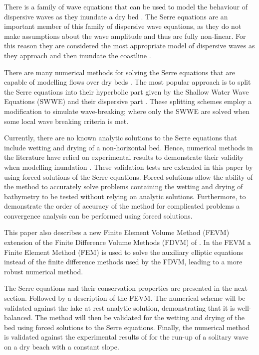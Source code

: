 \documentclass[times]{elsarticle}
\begin{document}
There is a family of wave equations that can be used to model the behaviour of dispersive waves as they inundate a dry bed \cite{Bonneton-Lannes-2009-16601}. The Serre equations \cite{Serre-F-1953-857} are an important member of this family of dispersive wave equations, as they do not make assumptions about the wave amplitude and thus are fully non-linear. For this reason they are considered the most appropriate model of dispersive waves as they approach and then inundate the coastline \cite{Bonneton-Lannes-2009-16601}.

There are many numerical methods for solving the Serre equations that are capable of modelling flows over dry beds \cite{Tissier-2011,Li-2014-169,Filippini-etal-2016-381,DoCarmo-2019-125}. The most popular approach is to split the Serre equations into their hyperbolic part given by the Shallow Water Wave Equations (SWWE) and their dispersive part \cite{Tissier-2011,Filippini-etal-2016-381,DoCarmo-2019-125}. These splitting schemes employ a modification to simulate wave-breaking; where only the SWWE are solved when some local wave breaking criteria is met. 

Currently, there are no known analytic solutions to the Serre equations that include wetting and drying of a non-horizontal bed. Hence, numerical methods in the literature have relied on experimental results to demonstrate their validity when modelling inundation \cite{Tissier-2011,Li-2014-169,Filippini-etal-2016-381,DoCarmo-2019-125}. These validation tests are extended in this paper by using forced solutions of the Serre equations. Forced solutions allow the ability of the method to accurately solve problems containing the wetting and drying of bathymetry to be tested without relying on analytic solutions. Furthermore, to demonstrate the order of accuracy of the method for complicated problems a convergence analysis can be performed using forced solutions. 

This paper also describes a new Finite Element Volume Method (FEVM) extension of the Finite Difference Volume Methods (FDVM) of \citet{Zoppou-etal-2017}. In the FEVM a Finite Element Method (FEM) is used to solve the auxiliary elliptic equations instead of the finite difference methods used by the FDVM, leading to a more robust numerical method.

The Serre equations and their conservation properties are presented in the next section. Followed by a description of the FEVM. The numerical scheme will be validated against the lake at rest analytic solution, demonstrating that it is well-balanced. The method will then be validated for the wetting and drying of the bed using forced solutions to the Serre equations. Finally, the numerical method is validated against the experimental results of \citet{Synolakis-1987-523} for the run-up of a solitary wave on a dry beach with a constant slope.
\end{document}
